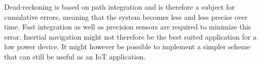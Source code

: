 Dead-reckoning is based on path integration and is therefore a subject for cumulative errors, meaning that the system becomes less and less precise over time. Fast integration as well as precision sensors are required to minimize this error. Inertial navigation might not therefore be the best suited application for a low power device. It might however be possible to implement a simpler scheme that can still be useful as an IoT application. 